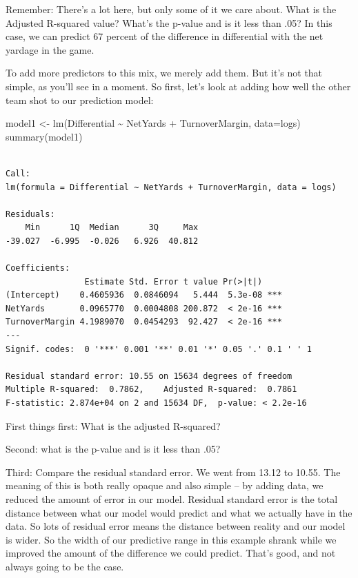 \documentclass[
  letterpaper,
  DIV=11,
  numbers=noendperiod]{scrreprt}
\newenvironment{Shaded}{\begin{snugshade}}{\end{snugshade}}
\newcommand{\AttributeTok}[1]{\textcolor[rgb]{0.40,0.45,0.13}{#1}}
\newcommand{\FunctionTok}[1]{\textcolor[rgb]{0.28,0.35,0.67}{#1}}
\newcommand{\NormalTok}[1]{\textcolor[rgb]{0.00,0.23,0.31}{#1}}
\newcommand{\OtherTok}[1]{\textcolor[rgb]{0.00,0.23,0.31}{#1}}
\newcommand{\SpecialCharTok}[1]{\textcolor[rgb]{0.37,0.37,0.37}{#1}}
\begin{document}
Remember: There's a lot here, but only some of it we care about. What is
the Adjusted R-squared value? What's the p-value and is it less than
.05? In this case, we can predict 67 percent of the difference in
differential with the net yardage in the game.

To add more predictors to this mix, we merely add them. But it's not
that simple, as you'll see in a moment. So first, let's look at adding
how well the other team shot to our prediction model:

\begin{Shaded}
\begin{Highlighting}[]
\NormalTok{model1 }\OtherTok{\textless{}{-}} \FunctionTok{lm}\NormalTok{(Differential }\SpecialCharTok{\textasciitilde{}}\NormalTok{ NetYards }\SpecialCharTok{+}\NormalTok{ TurnoverMargin, }\AttributeTok{data=}\NormalTok{logs)}
\FunctionTok{summary}\NormalTok{(model1)}
\end{Highlighting}
\end{Shaded}

\begin{verbatim}

Call:
lm(formula = Differential ~ NetYards + TurnoverMargin, data = logs)

Residuals:
    Min      1Q  Median      3Q     Max 
-39.027  -6.995  -0.026   6.926  40.812 

Coefficients:
                Estimate Std. Error t value Pr(>|t|)    
(Intercept)    0.4605936  0.0846094   5.444  5.3e-08 ***
NetYards       0.0965770  0.0004808 200.872  < 2e-16 ***
TurnoverMargin 4.1989070  0.0454293  92.427  < 2e-16 ***
---
Signif. codes:  0 '***' 0.001 '**' 0.01 '*' 0.05 '.' 0.1 ' ' 1

Residual standard error: 10.55 on 15634 degrees of freedom
Multiple R-squared:  0.7862,    Adjusted R-squared:  0.7861 
F-statistic: 2.874e+04 on 2 and 15634 DF,  p-value: < 2.2e-16
\end{verbatim}

First things first: What is the adjusted R-squared?

Second: what is the p-value and is it less than .05?

Third: Compare the residual standard error. We went from 13.12 to 10.55.
The meaning of this is both really opaque and also simple -- by adding
data, we reduced the amount of error in our model. Residual standard
error is the total distance between what our model would predict and
what we actually have in the data. So lots of residual error means the
distance between reality and our model is wider. So the width of our
predictive range in this example shrank while we improved the amount of
the difference we could predict. That's good, and not always going to be
the case.
\end{document}
